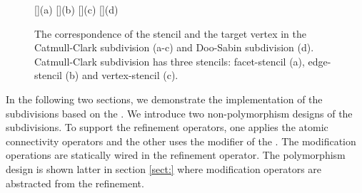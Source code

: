 \begin{figure}
  \centering
  []{(a)}
  []{(b)}
  []{(c)}
  []{(d)}
  \caption{The correspondence of the stencil and the 
           target vertex in the Catmull-Clark subdivision (a-c)
	   and Doo-Sabin subdivision (d). Catmull-Clark
	   subdivision has three stencils: facet-stencil (a), 
	   edge-stencil (b) and vertex-stencil (c).}
  \label{fig:RefMap}
\end{figure}

In the following two sections, we demonstrate the implementation of
the subdivisions based on the \cgalpoly.
We introduce two non-polymorphism designs of the subdivisions. 
To support the refinement operators, one applies the 
atomic connectivity operators and the other 
uses the modifier of the \cgalpoly . 
The modification operations are statically wired in the 
refinement operator. The polymorphism design is shown latter in 
section \ref{sect:} where modification operators are abstracted
from the refinement. 
